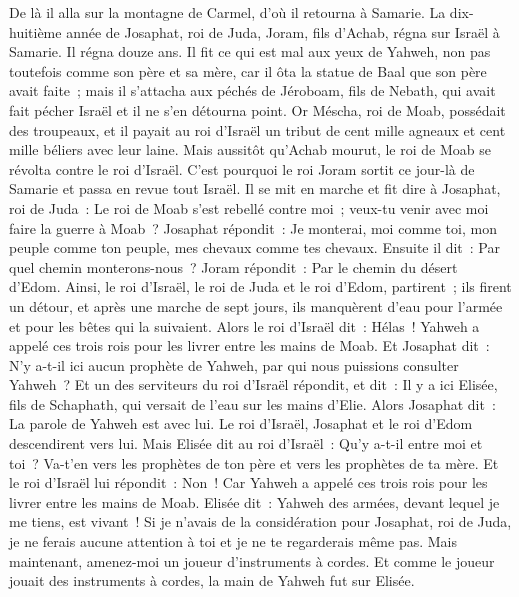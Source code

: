\begin{multicols}{2}
De là il alla sur la montagne de Carmel, d'où il retourna à Samarie.
\VerseOne{}La dix-huitième année de Josaphat, roi de Juda, Joram, fils d'Achab, régna sur Israël à Samarie. Il régna douze ans.
Il fit ce qui est mal aux yeux de Yahweh, non pas toutefois comme son père et sa mère, car il ôta la statue de Baal que son père avait faite~;
mais il s'attacha aux péchés de Jéroboam, fils de Nebath, qui avait fait pécher Israël et il ne s'en détourna point.
Or Méscha, roi de Moab, possédait des troupeaux, et il payait au roi d'Israël un tribut de cent mille agneaux et cent mille béliers avec leur laine.
Mais aussitôt qu'Achab mourut, le roi de Moab se révolta contre le roi d'Israël.
C'est pourquoi le roi Joram sortit ce jour-là de Samarie et passa en revue tout Israël.
Il se mit en marche et fit dire à Josaphat, roi de Juda~: Le roi de Moab s'est rebellé contre moi~; veux-tu venir avec moi faire la guerre à Moab~? Josaphat répondit~: Je monterai, moi comme toi, mon peuple comme ton peuple, mes chevaux comme tes chevaux.
Ensuite il dit~: Par quel chemin monterons-nous~? Joram répondit~: Par le chemin du désert d'Edom.
Ainsi, le roi d'Israël, le roi de Juda et le roi d'Edom, partirent~; ils firent un détour, et après une marche de sept jours, ils manquèrent d'eau pour l'armée et pour les bêtes qui la suivaient.
Alors le roi d'Israël dit~: Hélas~! Yahweh a appelé ces trois rois pour les livrer entre les mains de Moab.
Et Josaphat dit~: N'y a-t-il ici aucun prophète de Yahweh, par qui nous puissions consulter Yahweh~? Et un des serviteurs du roi d'Israël répondit, et dit~: Il y a ici Elisée, fils de Schaphath, qui versait de l'eau sur les mains d'Elie.
Alors Josaphat dit~: La parole de Yahweh est avec lui. Le roi d'Israël, Josaphat et le roi d'Edom descendirent vers lui.
Mais Elisée dit au roi d'Israël~: Qu'y a-t-il entre moi et toi~? Va-t'en vers les prophètes de ton père et vers les prophètes de ta mère. Et le roi d'Israël lui répondit~: Non~! Car Yahweh a appelé ces trois rois pour les livrer entre les mains de Moab.
Elisée dit~: Yahweh des armées, devant lequel je me tiens, est vivant~! Si je n'avais de la considération pour Josaphat, roi de Juda, je ne ferais aucune attention à toi et je ne te regarderais même pas.
Mais maintenant, amenez-moi un joueur d'instruments à cordes. Et comme le joueur jouait des instruments à cordes, la main de Yahweh fut sur Elisée.

\end{multicols}
